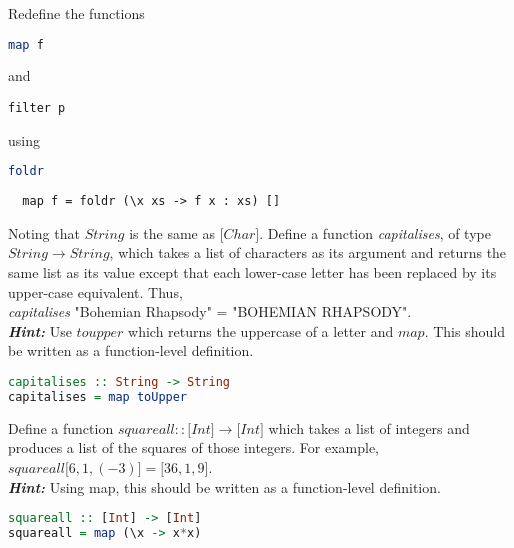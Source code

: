 \documentclass{article}
\begin{document}
\begin{Exercise} [difficulty=4]
Redefine the functions 
\begin{lstlisting}[language=Haskell]
map f
\end{lstlisting}
and
\begin{lstlisting}
filter p
\end{lstlisting}
using
\begin{lstlisting}[language=Haskell]
foldr
\end{lstlisting}

\end{Exercise} 
\begin{Answer}
  \begin{lstlisting}
  map f = foldr (\x xs -> f x : xs) []
\end{lstlisting}
\pagebreak
\end{Answer}
\begin{Exercise}
Noting that $String$ is the same as $\lbrack Char \rbrack$. Define a function \textit{capitalises}, of type
$String \rightarrow String$, which takes a list of characters as its argument and returns the
same list as its value except that each lower-case letter has been replaced by its
upper-case equivalent. Thus, \\ \textit{capitalises} "Bohemian Rhapsody" = "BOHEMIAN RHAPSODY". \\
\textbf{\textit{Hint:}} Use $toupper$ which returns the uppercase of a letter and  $map$. This should be written as a function-level definition. 
\end{Exercise} 
\begin{Answer}
\begin{lstlisting}[language=Haskell]
capitalises :: String -> String
capitalises = map toUpper
\end{lstlisting} 
\end{Answer}

\begin{Exercise} [difficulty=3]
Define a function $squareall :: \lbrack Int \rbrack  \rightarrow  \lbrack Int \rbrack $ which takes a list of integers and
produces a list of the squares of those integers. For example, \\
$squareall \lbrack 6, 1, (-3) \rbrack = \lbrack 36, 1, 9 \rbrack $. \\
\textbf{\textit{Hint:}} Using map, this should be written as a function-level definition. 
\end{Exercise} 
\begin{Answer}
\begin{lstlisting}[language=Haskell]
squareall :: [Int] -> [Int]
squareall = map (\x -> x*x)
\end{lstlisting}
\end{Answer}
\end{document}
